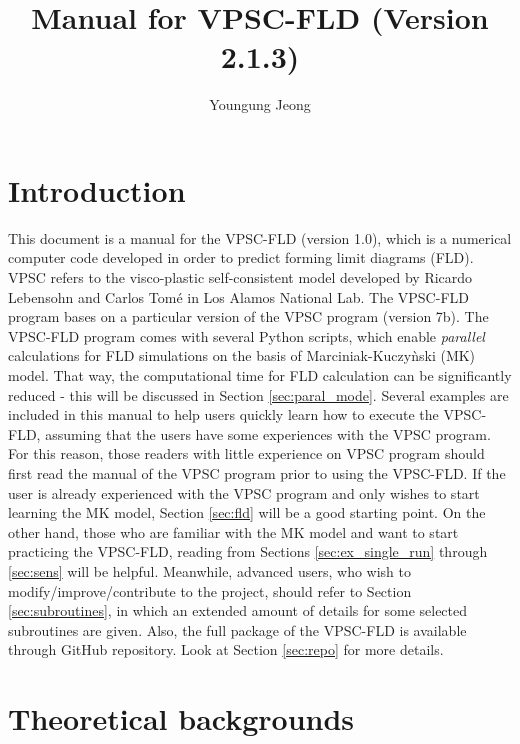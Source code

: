 \documentclass[12pt]{amsart}
\author{Youngung Jeong}
\title{Manual for VPSC-FLD (Version 2.1.3)}
\begin{document}

\newpage
\maketitle
\newpage
\setcounter{tocdepth}{1}
\tableofcontents
\newpage
\lstlistoflistings
\newpage
\section{Introduction}
This document is a manual for the VPSC-FLD (version 1.0), which is a numerical computer code developed in order to predict forming limit diagrams (FLD).
VPSC refers to the visco-plastic self-consistent model developed by Ricardo Lebensohn and Carlos Tom\'{e} in Los Alamos National Lab.
The VPSC-FLD program bases on a particular version of the VPSC program (version 7b).
\newline
The VPSC-FLD program comes with several Python scripts, which enable \emph{parallel} calculations for FLD simulations on the basis of Marciniak-Kuczy{\`n}ski (MK) model.
That way, the computational time for FLD calculation can be significantly reduced - this will be discussed in Section \ref{sec:paral_mode}.
Several examples are included in this manual to help users quickly learn how to execute the VPSC-FLD, assuming that the users have some experiences with the VPSC program.
For this reason, those readers with little experience on VPSC program should first read the manual of the VPSC program \cite{Tome2009} prior to using the VPSC-FLD.
If the user is already experienced with the VPSC program and only wishes to start learning the MK model, Section \ref{sec:fld} will be a good starting point.
On the other hand, those who are familiar with the MK model and want to start practicing the VPSC-FLD, reading from Sections \ref{sec:ex_single_run} through \ref{sec:sens} will be helpful.
Meanwhile, advanced users, who wish to modify/improve/contribute to the project, should refer to Section \ref{sec:subroutines}, in which an extended amount of details for some selected subroutines are given.
Also, the full package of the VPSC-FLD is available through GitHub repository. Look at Section \ref{sec:repo} for more details.
\newpage
\section{Theoretical backgrounds}
\label{sec:theory}
\end{document}

